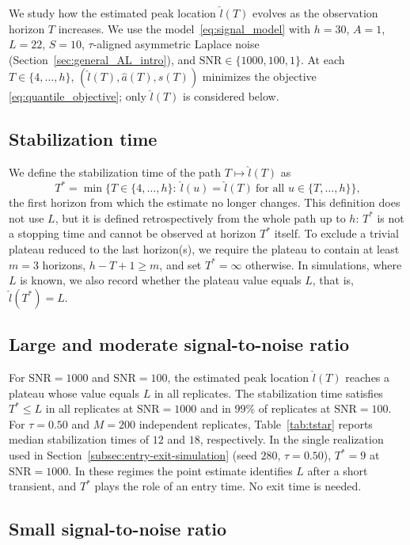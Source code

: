 \documentclass[12pt,a4paper]{article}
\begin{document}
We study how the estimated peak location $\hat l(T)$ evolves as the
observation horizon $T$ increases. We use the model~\eqref{eq:signal_model}
with $h=30$, $A=1$, $L=22$, $S=10$, $\tau$-aligned asymmetric Laplace
noise (Section~\ref{sec:general_AL_intro}), and
$\mathrm{SNR}\in\{1000,100,1\}$. At each $T\in\{4,\dots,h\}$,
$(\hat l(T),\hat a(T),\hat s(T))$ minimizes the objective
\eqref{eq:quantile_objective}; only $\hat l(T)$ is considered below.

\subsection{Stabilization time}

We define the stabilization time of the path $T\mapsto\hat l(T)$ as
\[
T^{*}
=
\min\{T\in\{4,\dots,h\}:\ \hat l(u)=\hat l(T)\ \text{for all }u\in\{T,\dots,h\}\},
\]
the first horizon from which the estimate no longer changes.
This definition does not use $L$, but it is defined retrospectively from the
whole path up to $h$: $T^{*}$ is not a stopping time and cannot be observed at
horizon $T^{*}$ itself. To exclude a trivial plateau reduced to the last horizon(s),
we require the plateau to contain at least $m=3$ horizons, $h-T+1\ge m$, and
set $T^{*}=\infty$ otherwise. In simulations, where $L$ is known, we also
record whether the plateau value equals $L$, that is, $\hat l(T^{*})=L$.

\subsection{Large and moderate signal-to-noise ratio}

For $\mathrm{SNR}=1000$ and $\mathrm{SNR}=100$, the estimated peak location $\hat l(T)$ reaches a plateau whose value equals $L$ in all replicates. The stabilization time satisfies $T^*\leq L$ in all replicates at $\mathrm{SNR}=1000$ and in $99\%$ of replicates at $\mathrm{SNR}=100$. For $\tau=0.50$ and $M=200$ independent replicates, Table~\ref{tab:tstar} reports median stabilization times of $12$ and $18$, respectively.
In the single realization used in
Section~\ref{subsec:entry-exit-simulation} (seed $280$, $\tau=0.50$),
$T^{*}=9$ at $\mathrm{SNR}=1000$. In these regimes the point estimate
identifies $L$ after a short transient, and $T^{*}$ plays the role of an entry
time. No exit time is needed.

\subsection{Small signal-to-noise ratio}
\end{document}
